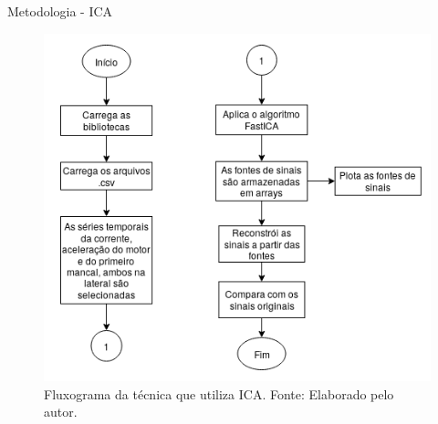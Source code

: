 \documentclass[aspectratio=169]{beamer}
\begin{document}

\begin{frame}{Metodologia - ICA}
	\begin{figure}[HT]
		\begin{center}
			\includegraphics[scale=.38]{../metodologia/img/ica.png}
			\caption{Fluxograma da técnica que utiliza ICA. \newline
			Fonte: Elaborado pelo autor.}
			\label{fig:ica}
		\end{center}
	\end{figure}
\end{frame}

\end{document}
